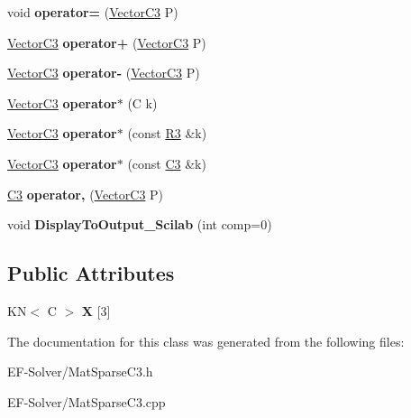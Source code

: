 \begin{DoxyCompactItemize}
\item 
void {\bfseries operator=} (\hyperlink{class_vector_c3}{Vector\+C3} P)\hypertarget{class_vector_c3_a8c133e29eb3733007be7ba0bbdadf190}{}\label{class_vector_c3_a8c133e29eb3733007be7ba0bbdadf190}

\item 
\hyperlink{class_vector_c3}{Vector\+C3} {\bfseries operator+} (\hyperlink{class_vector_c3}{Vector\+C3} P)\hypertarget{class_vector_c3_ae2765a2acbadf47e33502c619057b699}{}\label{class_vector_c3_ae2765a2acbadf47e33502c619057b699}

\item 
\hyperlink{class_vector_c3}{Vector\+C3} {\bfseries operator-\/} (\hyperlink{class_vector_c3}{Vector\+C3} P)\hypertarget{class_vector_c3_a9c03d0194fce8742b8bf92add8f0e3cc}{}\label{class_vector_c3_a9c03d0194fce8742b8bf92add8f0e3cc}

\item 
\hyperlink{class_vector_c3}{Vector\+C3} {\bfseries operator$\ast$} (C k)\hypertarget{class_vector_c3_a9365b497c814c95813bd8743f020b0f3}{}\label{class_vector_c3_a9365b497c814c95813bd8743f020b0f3}

\item 
\hyperlink{class_vector_c3}{Vector\+C3} {\bfseries operator$\ast$} (const \hyperlink{class_r3}{R3} \&k)\hypertarget{class_vector_c3_a1e1f6ebb846586a1e903bc61bfad408b}{}\label{class_vector_c3_a1e1f6ebb846586a1e903bc61bfad408b}

\item 
\hyperlink{class_vector_c3}{Vector\+C3} {\bfseries operator$\ast$} (const \hyperlink{class_c3}{C3} \&k)\hypertarget{class_vector_c3_adc374454d28460c1fa6de96da06a10fd}{}\label{class_vector_c3_adc374454d28460c1fa6de96da06a10fd}

\item 
\hyperlink{class_c3}{C3} {\bfseries operator,} (\hyperlink{class_vector_c3}{Vector\+C3} P)\hypertarget{class_vector_c3_ace99ee3f7501ff831cf1f47360b6bb08}{}\label{class_vector_c3_ace99ee3f7501ff831cf1f47360b6bb08}

\item 
void {\bfseries Display\+To\+Output\+\_\+\+Scilab} (int comp=0)\hypertarget{class_vector_c3_a0b5bba62609fd10699b9802f950ed452}{}\label{class_vector_c3_a0b5bba62609fd10699b9802f950ed452}

\end{DoxyCompactItemize}
\subsection*{Public Attributes}
\begin{DoxyCompactItemize}
\item 
KN$<$ C $>$ {\bfseries X} \mbox{[}3\mbox{]}\hypertarget{class_vector_c3_a9818588737fda61faa6bda68932294fc}{}\label{class_vector_c3_a9818588737fda61faa6bda68932294fc}

\end{DoxyCompactItemize}


The documentation for this class was generated from the following files\+:\begin{DoxyCompactItemize}
\item 
E\+F-\/\+Solver/Mat\+Sparse\+C3.\+h\item 
E\+F-\/\+Solver/Mat\+Sparse\+C3.\+cpp\end{DoxyCompactItemize}
